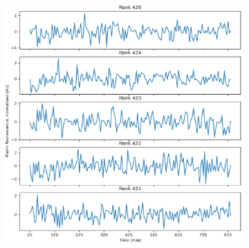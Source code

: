 \begin{figure}[htbp]
  \centering
  \begin{subfigure}[t]{0.65\textwidth}
  \centering
    \includegraphics[width=\linewidth]{glynn_is20016_3_edit.pdf}
    \caption{
    }
    \label{fig:glynn-worst-ts}
  \end{subfigure}%
  \begin{subfigure}[t]{0.35\textwidth}
  \centering

\end{subfigure}
\end{figure}
